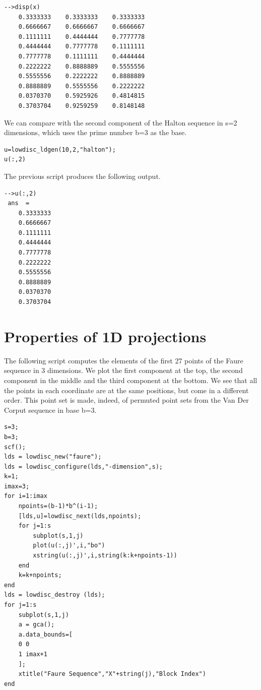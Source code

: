 \lstset{language=scilabscript}
\begin{lstlisting}
-->disp(x)
    0.3333333    0.3333333    0.3333333  
    0.6666667    0.6666667    0.6666667  
    0.1111111    0.4444444    0.7777778  
    0.4444444    0.7777778    0.1111111  
    0.7777778    0.1111111    0.4444444  
    0.2222222    0.8888889    0.5555556  
    0.5555556    0.2222222    0.8888889  
    0.8888889    0.5555556    0.2222222  
    0.0370370    0.5925926    0.4814815  
    0.3703704    0.9259259    0.8148148  
\end{lstlisting}

    
      We can compare with the second component of the
      Halton sequence in s=2 dimensions, which uses the
      prime number b=3 as the base.
    

\lstset{language=scilabscript}
\begin{lstlisting}
u=lowdisc_ldgen(10,2,"halton");
u(:,2)
\end{lstlisting}

    
      The previous script produces the following output.
    

\lstset{language=scilabscript}
\begin{lstlisting}
-->u(:,2)
 ans  =
    0.3333333  
    0.6666667  
    0.1111111  
    0.4444444  
    0.7777778  
    0.2222222  
    0.5555556  
    0.8888889  
    0.0370370  
    0.3703704  
\end{lstlisting}

\section{Properties of 1D projections}

    
      The following script computes the elements of the first 27 
	  points of the Faure sequence in 3 dimensions. 
	  We plot the first component at the top, the second component 
	  in the middle and the third component at the bottom. 
	  We see that all the points in each coordinate are at the 
	  same positions, but come in a different order. 
	  This point set is made, indeed, of permuted point sets 
	  from the Van Der Corput sequence in base b=3.
    

\lstset{language=scilabscript}
\begin{lstlisting}
s=3;
b=3;
scf();
lds = lowdisc_new("faure");
lds = lowdisc_configure(lds,"-dimension",s);
k=1;
imax=3;
for i=1:imax
    npoints=(b-1)*b^(i-1);
    [lds,u]=lowdisc_next(lds,npoints);
    for j=1:s
        subplot(s,1,j)
        plot(u(:,j)',i,"bo")
        xstring(u(:,j)',i,string(k:k+npoints-1))
    end
    k=k+npoints;
end
lds = lowdisc_destroy (lds);
for j=1:s
    subplot(s,1,j)
    a = gca();
    a.data_bounds=[
    0 0
    1 imax+1
    ];
    xtitle("Faure Sequence","X"+string(j),"Block Index")
end
\end{lstlisting}
    
